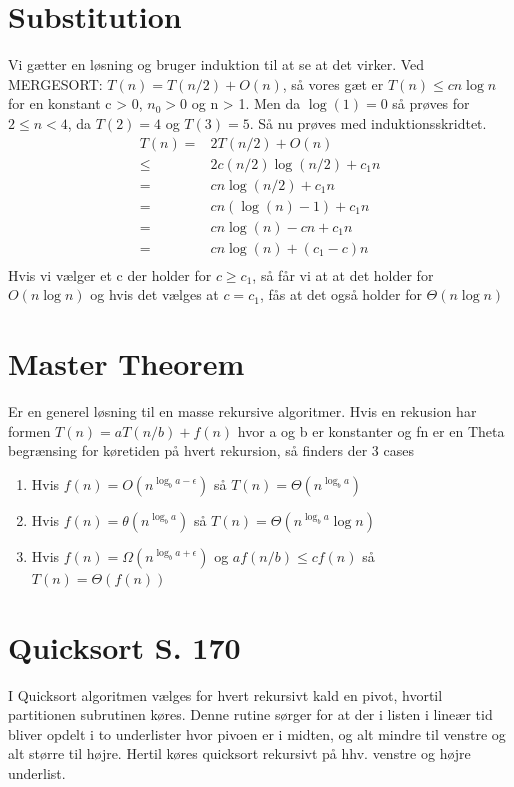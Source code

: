 \documentclass[11pt,a4paper]{report}
\theoremstyle{plain}
\theoremstyle{definition}
\theoremstyle{remark}
\numberwithin{equation}{section}
\begin{document}
\section{Substitution}
Vi gætter en løsning og bruger induktion til at se at det virker. Ved MERGESORT: $T(n) = T(n/2) + O(n)$, så vores gæt er $T(n) \leq c n \log n$ for en konstant c > 0, $n_0 > 0$ og n > 1. Men da $\log(1) = 0$ så prøves for $2 \leq n < 4$, da $T(2)=4$ og $T(3)=5$. Så nu prøves med induktionsskridtet.
\begin{align*}
    T(n) =& 2T(n/2) + O(n) \\
    \leq& 2 c(n/2) \log(n/2) + c_1 n \\
    =&  cn \log(n/2) + c_1 n  \\
    =&  cn (\log(n) - 1) + c_1 n  \\
    =&  cn \log(n) - cn + c_1 n  \\
    =&  cn \log(n) + (c_1 - c) n  \\
\end{align*}
Hvis vi vælger et c der holder for $c \geq c_1$, så får vi at at det holder for $O(n \log n)$ og hvis det vælges at $c = c_1$, fås at det også holder for $\Theta(n \log n)$

\section{Master Theorem}
Er en generel løsning til en masse rekursive algoritmer. Hvis en rekusion har formen $T(n) = a T(n/b) + f(n)$ hvor a og b er konstanter og fn er en Theta begrænsing for køretiden på hvert rekursion, så finders der 3 cases
\begin{enumerate}
  \item Hvis $f(n) = O(n^{\log_b a - \epsilon})$ så $T(n) = \Theta(n^{\log_b a})$
  \item Hvis $f(n) = \theta(n^{\log_b a })$ så $T(n) = \Theta(n^{\log_b a}\log n)$
  \item Hvis $f(n) = \Omega(n^{\log_b a + \epsilon})$ og $a f(n/b) \leq cf(n)$ så $T(n) = \Theta(f(n))$
\end{enumerate}

\section{Quicksort S. 170}
I Quicksort algoritmen vælges for hvert rekursivt kald en pivot, hvortil partitionen subrutinen køres. Denne rutine sørger for at der i listen i lineær tid bliver opdelt i to underlister hvor pivoen er i midten, og alt mindre til venstre og alt større til højre. Hertil køres quicksort rekursivt på hhv. venstre og højre underlist.
\end{document}
